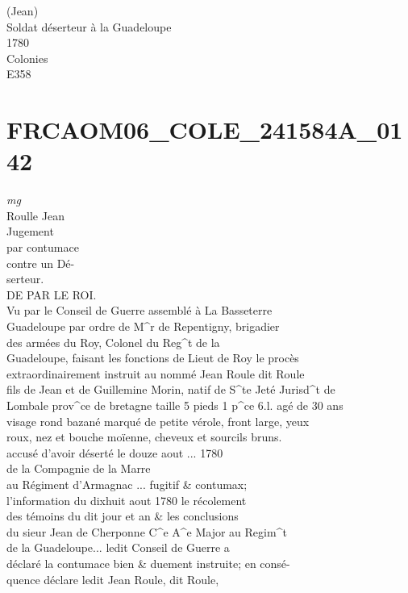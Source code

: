 \documentclass{article}
\begin{document}
\begin{pages}
(Jean)\\
Soldat déserteur à la Guadeloupe\\
1780\\
Colonies\\
E358
\pend
\endnumbering\beginnumbering\section{FRCAOM06\_COLE\_241584A\_0142}
\vspace{0.5cm}\noindent
\textit{mg}
\footnotesize \\
Roulle Jean\\
Jugement\\
par contumace\\
contre un Dé-\\
serteur.
\normalsize \pstart
\\
DE PAR LE ROI.\\
Vu par le Conseil de Guerre assemblé à La Basseterre\\
Guadeloupe par ordre de M\^{}r de Repentigny, brigadier\\
des armées du Roy, Colonel du Reg\^{}t de la\\
Guadeloupe, faisant les fonctions de Lieut de Roy le procès\\
extraordinairement instruit au nommé Jean Roule dit Roule\\
fils de Jean et de Guillemine Morin, natif de S\^{}te Jeté Jurisd\^{}t de\\
Lombale prov\^{}ce de bretagne taille 5 pieds 1 p\^{}ce 6.l. agé de 30 ans\\
visage rond bazané marqué de petite vérole, front large, yeux\\
roux, nez et bouche moïenne, cheveux et sourcils bruns.\\
accusé d'avoir déserté le douze aout ... 1780\\
de la Compagnie de la Marre\\
au Régiment d'Armagnac ... fugitif \& contumax;\\
l'information du dixhuit aout 1780 le récolement\\
des témoins du dit jour et an \& les conclusions\\
du sieur Jean de Cherponne C\^{}e A\^{}e Major au Regim\^{}t\\
de la Guadeloupe... ledit Conseil de Guerre a\\
déclaré la contumace bien \& duement instruite; en consé-\\
quence déclare ledit Jean Roule, dit Roule,\\

\end{pages}
\end{document}
